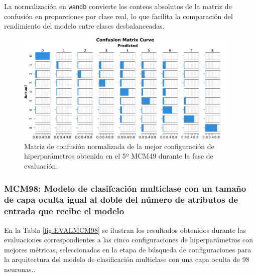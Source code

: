 La normalización en \texttt{wandb} convierte los conteos absolutos de la matriz de confusión en proporciones por clase real, lo que facilita la comparación del rendimiento del modelo entre clases desbalanceadas.

\begin{figure}[H]
    \centering
    \includegraphics[width=0.95\textwidth]{./img/evaluacion/matrices_confusion/MCNorm_EVAL_MCM49.pdf}
    \caption{Matriz de confusión normalizada de la mejor configuración de hiperparámetros obtenida en el 5º MCM49 durante la fase de evaluación.}
    \label{fig:MCNorm_EVAL_MCM49}
\end{figure}




\subsubsection{MCM98: Modelo de clasifcación multiclase con un tamaño de capa oculta igual al doble del número de atributos de entrada que recibe el modelo}
En la Tabla \ref{fig:EVALMCM98} se ilustran los resultados obtenidos durante las evaluaciones correspondientes a las cinco configuraciones de hiperparámetros con mejores métricas, seleccionadas en la etapa de búsqueda de configuraciones para la arquitectura del modelo de clasificación multiclase con una capa oculta de 98 neuronas..

